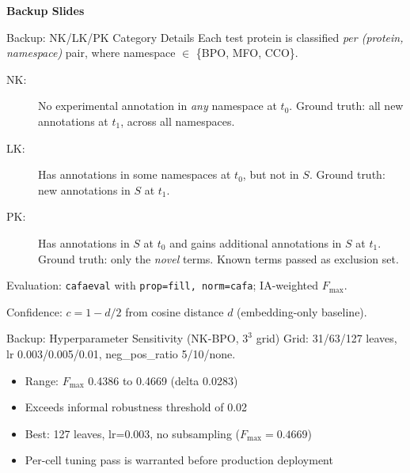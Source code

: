 \documentclass[12pt, aspectratio=169]{beamer}
\newcommand{\fmax}{$F_{\max}$}
\begin{document}
\appendix

\begin{frame}
  \begin{center}
    {\Large\textbf{Backup Slides}}
  \end{center}
\end{frame}

\begin{frame}{Backup: NK/LK/PK Category Details}
  Each test protein is classified \emph{per (protein, namespace)} pair, where
  namespace $\in$ \{BPO, MFO, CCO\}.

  \begin{description}
    \item[NK:] No experimental annotation in \emph{any} namespace at $t_0$.
              Ground truth: all new annotations at $t_1$, across all namespaces.
    \item[LK:] Has annotations in some namespaces at $t_0$, but not in $S$.
              Ground truth: new annotations in $S$ at $t_1$.
    \item[PK:] Has annotations in $S$ at $t_0$ and gains additional annotations in $S$ at $t_1$.
              Ground truth: only the \emph{novel} terms. Known terms passed as exclusion set.
  \end{description}
  \vspace{0.5em}
  Evaluation: \texttt{cafaeval} with \texttt{prop=fill, norm=cafa}; IA-weighted \fmax.

  Confidence: $c = 1 - d/2$ from cosine distance $d$ (embedding-only baseline).
\end{frame}

\begin{frame}{Backup: Hyperparameter Sensitivity (NK-BPO, $3^3$ grid)}
  Grid: 31/63/127 leaves, lr 0.003/0.005/0.01, neg\_pos\_ratio 5/10/none.
  \begin{itemize}
    \item Range: $F_{\max}$ 0.4386 to 0.4669 (delta 0.0283)
    \item Exceeds informal robustness threshold of 0.02
    \item Best: 127 leaves, lr=0.003, no subsampling ($F_{\max}=0.4669$)
    \item Per-cell tuning pass is warranted before production deployment
  \end{itemize}
\end{frame}
\end{document}

